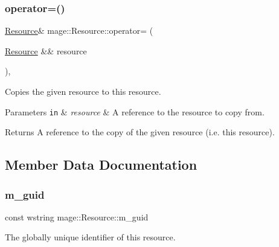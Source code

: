 \subsubsection{\texorpdfstring{operator=()}{operator=()}\hspace{0.1cm}{\footnotesize\ttfamily [2/2]}}
{\footnotesize\ttfamily \hyperlink{classmage_1_1_resource}{Resource}\& mage\+::\+Resource\+::operator= (\begin{DoxyParamCaption}\item[{\hyperlink{classmage_1_1_resource}{Resource} \&\&}]{resource }\end{DoxyParamCaption})\hspace{0.3cm}{\ttfamily [private]}, {\ttfamily [delete]}}

Copies the given resource to this resource.


\begin{DoxyParams}[1]{Parameters}
\mbox{\tt in}  & {\em resource} & A reference to the resource to copy from. \\
\hline
\end{DoxyParams}
\begin{DoxyReturn}{Returns}
A reference to the copy of the given resource (i.\+e. this resource). 
\end{DoxyReturn}


\subsection{Member Data Documentation}
\hypertarget{classmage_1_1_resource_aa5e176b2528581bf1b662f5a77aeef40}{}\label{classmage_1_1_resource_aa5e176b2528581bf1b662f5a77aeef40} 
\subsubsection{\texorpdfstring{m\+\_\+guid}{m\_guid}}
{\footnotesize\ttfamily const wstring mage\+::\+Resource\+::m\+\_\+guid\hspace{0.3cm}{\ttfamily [private]}}

The globally unique identifier of this resource. 